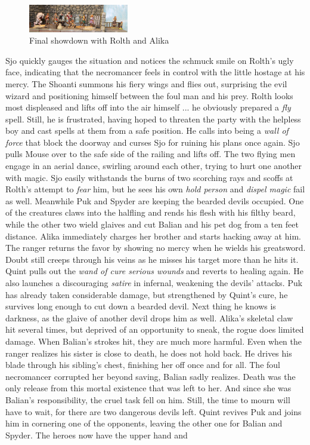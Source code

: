 \begin{figure}[h]
	\centering
	\includegraphics[width=0.39\textwidth]{images/Final-showdown-with-Rolth-and-Alika-559765837.jpg}
	\caption{Final showdown with Rolth and Alika}
	\label{fig:Final-showdown-with-Rolth-and-Alika-559765837}
\end{figure}

Sjo quickly gauges the situation and notices the schmuck smile on Rolth's ugly face, indicating that the necromancer feels in control with the little hostage at his mercy. The Shoanti summons his fiery wings and flies out, surprising the evil wizard and positioning himself between the foul man and his prey. Rolth looks most displeased and lifts off into the air himself ... he obviously prepared a {\itshape fly} spell. Still, he is frustrated, having hoped to threaten the party with the helpless boy and cast spells at them from a safe position. He calls into being a  {\itshape wall of force} that block the doorway and curses Sjo for ruining his plans once again. Sjo pulls Mouse over to the safe side of the railing and lifts off. The two flying men engage in an aerial dance, swirling around each other, trying to hurt one another with magic. Sjo easily withstands the burns of two scorching rays and scoffs at Rolth's attempt to  {\itshape fear} him, but he sees his own  {\itshape hold person} and  {\itshape dispel magic} fail as well. Meanwhile Puk and Spyder are keeping the bearded devils occupied. One of the creatures claws into the halfling and rends his flesh with his filthy beard, while the other two wield glaives and cut Balian and his pet dog from a ten feet distance. Alika immediately charges her brother and starts hacking away at him. The ranger returns the favor by showing no mercy when he wields his greatsword. Doubt still creeps through his veins as he misses his target more than he hits it. Quint pulls out the {\itshape wand of cure serious wounds} and reverts to healing again. He also launches a discouraging  {\itshape satire} in infernal, weakening the devils' attacks. Puk has already taken considerable damage, but strengthened by Quint's cure, he survives long enough to cut down a bearded devil. Next thing he knows is darkness, as the glaive of another devil drops him as well. Alika's skeletal claw hit several times, but deprived of an opportunity to sneak, the rogue does limited damage. When Balian's strokes hit, they are much more harmful. Even when the ranger realizes his sister is close to death, he does not hold back. He drives his blade through his sibling's chest, finishing her off once and for all. The foul necromancer corrupted her beyond saving, Balian sadly realizes. Death was the only release from this mortal existence that was left to her. And since she was Balian's responsibility, the cruel task fell on him. Still, the time to mourn will have to wait, for there are two dangerous devils left. Quint revives Puk and joins him in cornering one of the opponents, leaving the other one for Balian and Spyder. The heroes now have the upper hand and 
